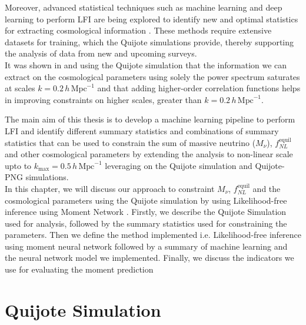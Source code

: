 Moreover, advanced statistical techniques such as machine learning and deep learning to perform LFI are being explored to identify new and optimal statistics for extracting cosmological information \cite{Jung:2024esv, Alsing_2019, Charnock_2018}. These methods require extensive datasets for training, which the Quijote simulations provide, thereby supporting the analysis of data from new and upcoming surveys. \\
It was shown in \cite{Bayer_2021} and \cite{Coulton_2023} using the Quijote simulation that the information we can extract on the cosmological parameters using solely the power spectrum saturates at scales $k = 0.2\,h\,\mathrm{Mpc}^{-1}$ and that adding higher-order correlation functions helps in improving constraints on higher scales, greater than $k = 0.2\,h\,\mathrm{Mpc}^{-1}$.

The main aim of this thesis is to develop a machine learning pipeline to perform LFI and identify different summary statistics and combinations of summary statistics that can be used to constrain the sum of massive neutrino ($M_{\nu}$), $f_{NL}^{\mathrm{equil}}$ and other cosmological parameters by extending the analysis to non-linear scale upto to $k_{\mathrm{max}} = 0.5\,h\,\mathrm{Mpc}^{-1}$ leveraging on the Quijote simulation and Quijote-PNG simulations.\\

In this chapter, we will discuss our approach to constraint $M_{\nu}$, $ f_{NL}^{\mathrm{equil}}$ and the cosmological parameters using the Quijote simulation by using Likelihood-free inference using Moment Network \cite{jeffrey2020solvinghighdimensionalparameterinference}.
Firstly, we describe the Quijote Simulation used for analysis, followed by the summary statistics used for constraining the parameters. Then we define the method implemented i.e. Likelihood-free inference using moment neural network followed by a summary of machine learning and the neural network model we implemented. Finally, we discuss the indicators we use for evaluating the moment prediction

\section{Quijote Simulation}


